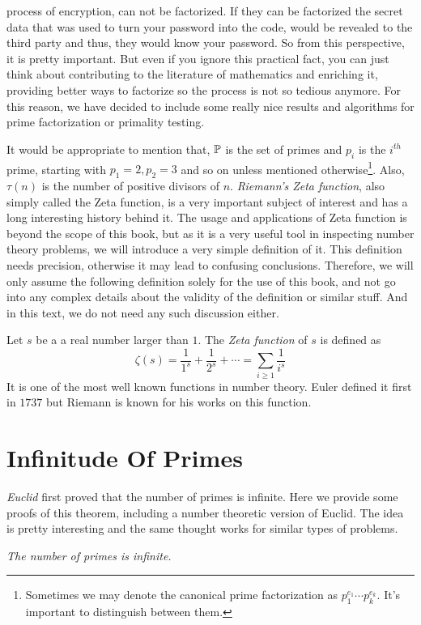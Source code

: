 \documentclass{subfiles}
\begin{document}
process of encryption, can not be factorized. If they can be factorized the secret data that was used to turn your password into the code, would be revealed to the third party and thus, they would know your password. So from this perspective, it is pretty important. But even if you ignore this practical fact, you can just think about contributing to the literature of mathematics and enriching it, providing better ways to factorize so the process is not so tedious anymore. For this reason, we have decided to include some really nice results and algorithms for prime factorization or primality testing.
	
	It would be appropriate to mention that, $\P $ is the set of primes and $p_i$ is the $i^{th}$ prime, starting with $p_1=2,p_2=3$ and so on unless mentioned otherwise\footnote{Sometimes we may denote the canonical prime factorization as $p_1^{e_1}\cdots p_k^{e_k}$. It's important to distinguish between them.}. Also, $\tau(n)$ is the number of positive divisors of $n$. \textit{Riemann's Zeta function}, also simply called the Zeta function, is a very important subject of interest and has a long interesting history behind it. The usage and applications of Zeta function is beyond the scope of this book, but as it is a very useful tool in inspecting number theory problems, we will introduce a very simple definition of it. This definition needs precision, otherwise it may lead to confusing conclusions. Therefore, we will only assume the following definition solely for the use of this book, and not go into any complex details about the validity of the definition or similar stuff. And in this text, we do not need any such discussion either.
		\begin{definition}
			Let $s$ be a a real number larger than $1$. The \textit{Zeta function} of $s$ is defined as
			\[\zeta(s)=\dfrac{1}{1^s}+\dfrac{1}{2^s}+\cdots=\sum_{i\geq1}\dfrac{1}{i^s}\]
			It is one of the most well known functions in number theory. Euler defined it first in $1737$ but Riemann is known for his works on this function.
		\end{definition}
	\section{Infinitude Of Primes}
	\label{sec:infiniteprimes}
	\textit{Euclid} first proved that the number of primes is infinite. Here we provide some proofs of this theorem, including a number theoretic version of Euclid. The idea is pretty interesting and the same thought works for similar types of problems.
		\begin{theorem}\sl
			The number of primes is infinite.
		\end{theorem}
		
\end{document}
